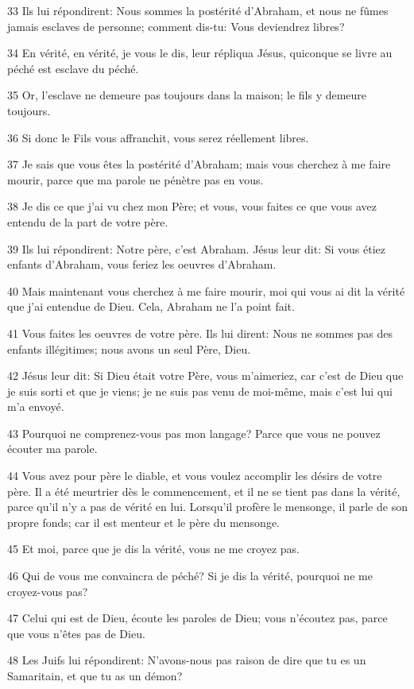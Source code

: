 \par 33 Ils lui répondirent: Nous sommes la postérité d'Abraham, et nous ne fûmes jamais esclaves de personne; comment dis-tu: Vous deviendrez libres?
\par 34 En vérité, en vérité, je vous le dis, leur répliqua Jésus, quiconque se livre au péché est esclave du péché.
\par 35 Or, l'esclave ne demeure pas toujours dans la maison; le fils y demeure toujours.
\par 36 Si donc le Fils vous affranchit, vous serez réellement libres.
\par 37 Je sais que vous êtes la postérité d'Abraham; mais vous cherchez à me faire mourir, parce que ma parole ne pénètre pas en vous.
\par 38 Je dis ce que j'ai vu chez mon Père; et vous, vous faites ce que vous avez entendu de la part de votre père.
\par 39 Ils lui répondirent: Notre père, c'est Abraham. Jésus leur dit: Si vous étiez enfants d'Abraham, vous feriez les oeuvres d'Abraham.
\par 40 Mais maintenant vous cherchez à me faire mourir, moi qui vous ai dit la vérité que j'ai entendue de Dieu. Cela, Abraham ne l'a point fait.
\par 41 Vous faites les oeuvres de votre père. Ils lui dirent: Nous ne sommes pas des enfants illégitimes; nous avons un seul Père, Dieu.
\par 42 Jésus leur dit: Si Dieu était votre Père, vous m'aimeriez, car c'est de Dieu que je suis sorti et que je viens; je ne suis pas venu de moi-même, mais c'est lui qui m'a envoyé.
\par 43 Pourquoi ne comprenez-vous pas mon langage? Parce que vous ne pouvez écouter ma parole.
\par 44 Vous avez pour père le diable, et vous voulez accomplir les désirs de votre père. Il a été meurtrier dès le commencement, et il ne se tient pas dans la vérité, parce qu'il n'y a pas de vérité en lui. Lorsqu'il profère le mensonge, il parle de son propre fonds; car il est menteur et le père du mensonge.
\par 45 Et moi, parce que je dis la vérité, vous ne me croyez pas.
\par 46 Qui de vous me convaincra de péché? Si je dis la vérité, pourquoi ne me croyez-vous pas?
\par 47 Celui qui est de Dieu, écoute les paroles de Dieu; vous n'écoutez pas, parce que vous n'êtes pas de Dieu.
\par 48 Les Juifs lui répondirent: N'avons-nous pas raison de dire que tu es un Samaritain, et que tu as un démon?
